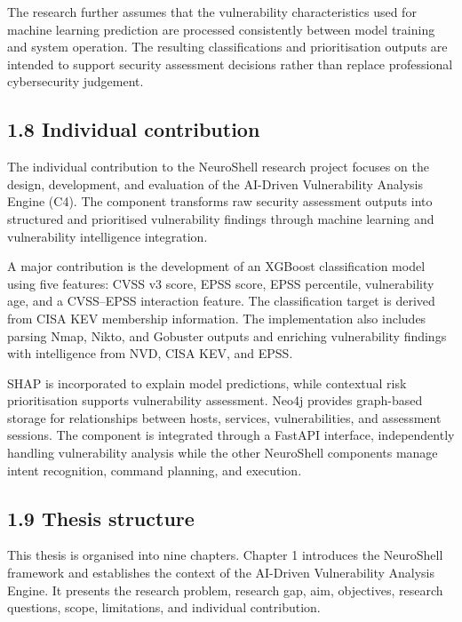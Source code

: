 \documentclass[
]{article}
\begin{document}
The research further assumes that the vulnerability characteristics used
for machine learning prediction are processed consistently between model
training and system operation. The resulting classifications and
prioritisation outputs are intended to support security assessment
decisions rather than replace professional cybersecurity judgement.

\hypertarget{individual-contribution}{%
\subsection{1.8 Individual contribution}\label{individual-contribution}}

The individual contribution to the NeuroShell research project focuses
on the design, development, and evaluation of the AI-Driven
Vulnerability Analysis Engine (C4). The component transforms raw
security assessment outputs into structured and prioritised
vulnerability findings through machine learning and vulnerability
intelligence integration.

A major contribution is the development of an XGBoost classification
model using five features: CVSS v3 score, EPSS score, EPSS percentile,
vulnerability age, and a CVSS--EPSS interaction feature. The
classification target is derived from CISA KEV membership information.
The implementation also includes parsing Nmap, Nikto, and Gobuster
outputs and enriching vulnerability findings with intelligence from NVD,
CISA KEV, and EPSS.

SHAP is incorporated to explain model predictions, while contextual risk
prioritisation supports vulnerability assessment. Neo4j provides
graph-based storage for relationships between hosts, services,
vulnerabilities, and assessment sessions. The component is integrated
through a FastAPI interface, independently handling vulnerability
analysis while the other NeuroShell components manage intent
recognition, command planning, and execution.

\hypertarget{thesis-structure}{%
\subsection{1.9 Thesis structure}\label{thesis-structure}}

This thesis is organised into nine chapters. Chapter 1 introduces the
NeuroShell framework and establishes the context of the AI-Driven
Vulnerability Analysis Engine. It presents the research problem,
research gap, aim, objectives, research questions, scope, limitations,
and individual contribution.
\end{document}
